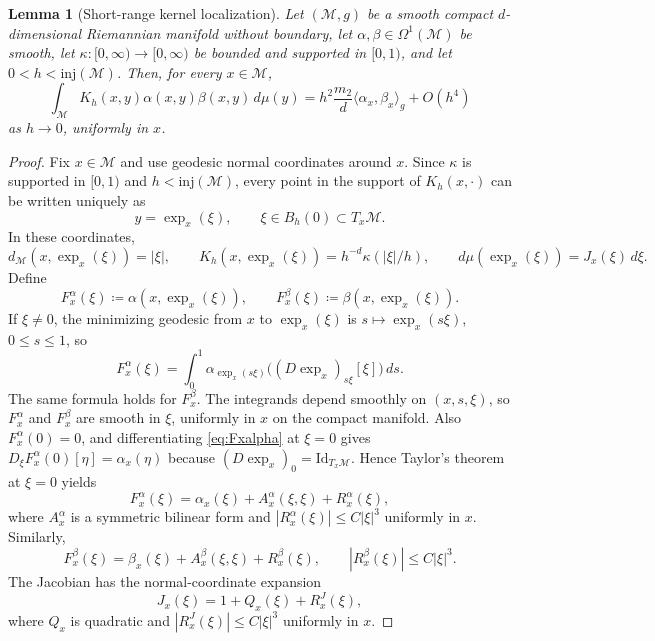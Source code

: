 \documentclass[a4paper,11pt, DIV=10]{scrartcl}
\numberwithin{equation}{section}
\newtheorem{lemma}[theorem]{Lemma}
\theoremstyle{definition}
\theoremstyle{remark}
\newcommand{\mc}[1]{\mathcal{#1}}
\begin{document}
\begin{lemma}[Short-range kernel localization]
Let $(\mc{M},g)$ be a smooth compact $d$-dimensional Riemannian manifold without boundary, let $\alpha,\beta\in \Omega^1(\mc{M})$ be smooth, let $\kappa\colon [0,\infty)\to [0,\infty)$ be bounded and supported in $[0,1)$, and let $0<h<\mathrm{inj}(\mc{M})$. Then, for every $x\in \mc{M}$,
\begin{equation}
\int_{\mc{M}} K_h(x,y)\alpha(x,y)\beta(x,y)\,d\mu(y)
=
h^2\frac{m_2}{d}\langle \alpha_x,\beta_x\rangle_g + O(h^4)
\end{equation}
as $h\to 0$, uniformly in $x$.
\end{lemma}
\begin{proof}
Fix $x\in \mc{M}$ and use geodesic normal coordinates around $x$. Since $\kappa$ is supported in $[0,1)$ and $h<\mathrm{inj}(\mc{M})$, every point in the support of $K_h(x,\cdot)$ can be written uniquely as
\begin{equation}
y=\exp_x(\xi),
\qquad
\xi\in B_h(0)\subset T_x\mc{M}.
\end{equation}
In these coordinates,
\begin{equation}
d_{\mc{M}}(x,\exp_x(\xi))=|\xi|,
\qquad
K_h(x,\exp_x(\xi))=h^{-d}\kappa(|\xi|/h),
\qquad
d\mu(\exp_x(\xi))=J_x(\xi)\,d\xi.
\end{equation}
Define
\begin{equation}
F_x^\alpha(\xi)\coloneq \alpha(x,\exp_x(\xi)),
\qquad
F_x^\beta(\xi)\coloneq \beta(x,\exp_x(\xi)).
\end{equation}
If $\xi\neq 0$, the minimizing geodesic from $x$ to $\exp_x(\xi)$ is $s\mapsto \exp_x(s\xi)$, $0\le s\le 1$, so
\begin{equation}
\label{eq:Fxalpha}
F_x^\alpha(\xi)
=
\int_0^1 \alpha_{\exp_x(s\xi)}\!\bigl((D\exp_x)_{s\xi}[\xi]\bigr)\,ds.
\end{equation}
The same formula holds for $F_x^\beta$. The integrands depend smoothly on $(x,s,\xi)$, so $F_x^\alpha$ and $F_x^\beta$ are smooth in $\xi$, uniformly in $x$ on the compact manifold. Also $F_x^\alpha(0)=0$, and differentiating \eqref{eq:Fxalpha} at $\xi=0$ gives $D_\xi F_x^\alpha(0)[\eta]=\alpha_x(\eta)$ because $(D\exp_x)_0=\mathrm{Id}_{T_x\mc{M}}$. Hence Taylor's theorem at $\xi=0$ yields
\begin{equation}
F_x^\alpha(\xi)
=
\alpha_x(\xi)+A_x^\alpha(\xi,\xi)+R_x^\alpha(\xi),
\end{equation}
where $A_x^\alpha$ is a symmetric bilinear form and $|R_x^\alpha(\xi)|\le C|\xi|^3$ uniformly in $x$. Similarly,
\begin{equation}
F_x^\beta(\xi)
=
\beta_x(\xi)+A_x^\beta(\xi,\xi)+R_x^\beta(\xi),
\qquad
|R_x^\beta(\xi)|\le C|\xi|^3.
\end{equation}
The Jacobian has the normal-coordinate expansion
\begin{equation}
J_x(\xi)=1+Q_x(\xi)+R_x^J(\xi),
\end{equation}
where $Q_x$ is quadratic and $|R_x^J(\xi)|\le C|\xi|^3$ uniformly in $x$.


\end{proof}
\end{document}
